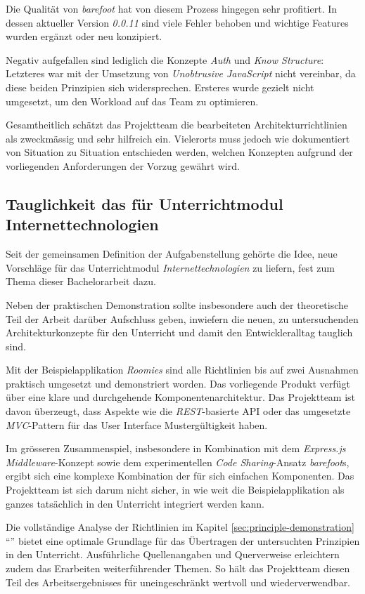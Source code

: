 Die Qualität von \emph{barefoot} hat von diesem Prozess hingegen sehr profitiert. In dessen aktueller Version \emph{0.0.11} sind viele Fehler behoben und wichtige Features wurden ergänzt oder neu konzipiert.

Negativ aufgefallen sind lediglich die Konzepte \emph{Auth} und \emph{Know Structure}: Letzteres war mit der Umsetzung von \emph{Unobtrusive JavaScript} nicht vereinbar, da diese beiden Prinzipien sich widersprechen. Ersteres wurde gezielt nicht umgesetzt, um den Workload auf das Team zu optimieren.

Gesamtheitlich schätzt das Projektteam die bearbeiteten Architekturrichtlinien als zweckmässig und sehr hilfreich ein. Vielerorts muss jedoch wie dokumentiert von Situation zu Situation entschieden werden, welchen Konzepten aufgrund der vorliegenden Anforderungen der Vorzug gewährt wird.


\subsection*{Tauglichkeit das für Unterrichtmodul Internettechnologien}

Seit der gemeinsamen Definition der Aufgabenstellung gehörte die Idee, neue Vorschläge für das Unterrichtmodul \emph{Internettechnologien} zu liefern, fest zum Thema dieser Bachelorarbeit dazu.

Neben der praktischen Demonstration sollte insbesondere auch der theoretische Teil der Arbeit darüber Aufschluss geben, inwiefern die neuen, zu untersuchenden Architekturkonzepte für den Unterricht und damit den Entwickleralltag tauglich sind.

Mit der Beispielapplikation \emph{Roomies} sind alle Richtlinien bis auf zwei Ausnahmen praktisch umgesetzt und demonstriert worden. Das vorliegende Produkt verfügt über eine klare und durchgehende Komponentenarchitektur. Das Projektteam ist davon überzeugt, dass Aspekte wie die \emph{REST}-basierte API oder das umgesetzte \emph{MVC}-Pattern für das User Interface Mustergültigkeit haben.

Im grösseren Zusammenspiel, insbesondere in Kombination mit dem \emph{Express.js Middleware}-Konzept sowie dem experimentellen \emph{Code Sharing}-Ansatz \emph{barefoot}s, ergibt sich eine komplexe Kombination der für sich einfachen Komponenten. Das Projektteam ist sich darum nicht sicher, in wie weit die Beispielapplikation als ganzes tatsächlich in den Unterricht integriert werden kann.

Die vollständige Analyse der Richtlinien im Kapitel \ref{sec:principle-demonstration} ``'' bietet eine optimale Grundlage für das Übertragen der untersuchten Prinzipien in den Unterricht. Ausführliche Quellenangaben und Querverweise erleichtern zudem das Erarbeiten weiterführender Themen. So hält das Projektteam diesen Teil des Arbeitsergebnisses für uneingeschränkt wertvoll und wiederverwendbar.


